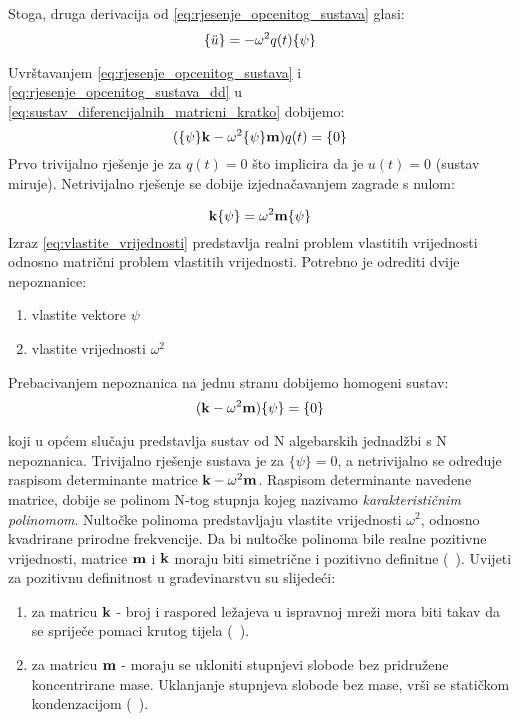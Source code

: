 Stoga, druga derivacija od \eqref{eq:rjesenje_opcenitog_sustava} glasi:
\begin{equation}\label{eq:rjesenje_opcenitog_sustava_dd}
    \vtor{u}{:}=-\omega^2q(t)\vtor{\psi}{}
\end{equation}

Uvrštavanjem \eqref{eq:rjesenje_opcenitog_sustava} i \eqref{eq:rjesenje_opcenitog_sustava_dd}
u \eqref{eq:sustav_diferencijalnih_matricni_kratko} dobijemo:
\begin{equation}
    (\vtor{\psi}{}\kk-\omega^2\vtor{\psi}{}\mm)q(t)=\vtor{0}{}
\end{equation}
Prvo trivijalno rješenje je za $q(t)=0$ što implicira da je $u(t)=0$ (sustav
miruje). Netrivijalno rješenje se dobije izjednačavanjem zagrade s nulom:

\begin{equation}\label{eq:vlastite_vrijednosti}
    \mathbf{k}\{\psi\}=\omega^2\mathbf{m}\{\psi\}
\end{equation}
Izraz \eqref{eq:vlastite_vrijednosti} predstavlja realni problem vlastitih
vrijednosti odnosno matrični problem vlastitih vrijednosti. Potrebno je odrediti
dvije nepoznanice: 
\begin{enumerate}
    \item vlastite vektore $\psi$
    \item vlastite vrijednosti $\omega^2$
\end{enumerate}

Prebacivanjem nepoznanica na jednu stranu dobijemo homogeni sustav:
\begin{equation}\label{eq:vlastite_vrijednosti_homogeno}
    (\kk-\omega^2\mm)\vtor{\psi}{}=\vtor{0}{}
\end{equation}

koji u općem slučaju predstavlja sustav od N algebarskih jednadžbi s N nepoznanica. 
Trivijalno rješenje sustava je za $\{\psi\}={0}$, a netrivijalno se određuje raspisom 
determinante matrice $\mathbf{k}-\omega^2\mathbf{m}$. Raspisom determinante navedene matrice, 
dobije se polinom N-tog stupnja kojeg nazivamo \textit{karakterističnim polinomom}. 
Nultočke polinoma predstavljaju vlastite vrijednosti $\omega^2$, odnosno kvadrirane 
prirodne frekvencije. Da bi nultočke polinoma bile realne pozitivne vrijednosti, 
matrice $\mathbf{m}$ i $\mathbf{k}$ moraju biti simetrične i pozitivno definitne (~\cite{dk_skripta}).
Uvijeti za pozitivnu definitnost u građevinarstvu su slijedeći:
\begin{enumerate}
    \item za matricu $\mathbf{k}$ - broj i raspored ležajeva u ispravnoj mreži mora biti
        takav da se spriječe pomaci krutog tijela (~\cite{dk_skripta}).
    \item za matricu $\mathbf{m}$ - moraju se ukloniti stupnjevi slobode bez pridružene
        koncentrirane mase. Uklanjanje stupnjeva slobode bez mase, vrši se
        statičkom kondenzacijom (~\cite{dk_skripta}). 
\end{enumerate}

